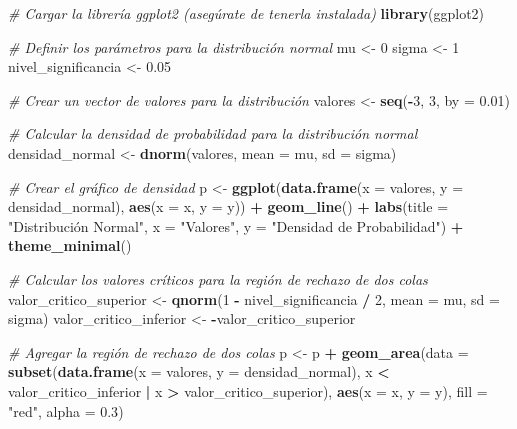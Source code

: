 \documentclass[
]{article}
\newenvironment{Shaded}{\begin{snugshade}}{\end{snugshade}}
\newcommand{\AttributeTok}[1]{\textcolor[rgb]{0.13,0.29,0.53}{#1}}
\newcommand{\CommentTok}[1]{\textcolor[rgb]{0.56,0.35,0.01}{\textit{#1}}}
\newcommand{\DecValTok}[1]{\textcolor[rgb]{0.00,0.00,0.81}{#1}}
\newcommand{\FloatTok}[1]{\textcolor[rgb]{0.00,0.00,0.81}{#1}}
\newcommand{\FunctionTok}[1]{\textcolor[rgb]{0.13,0.29,0.53}{\textbf{#1}}}
\newcommand{\NormalTok}[1]{#1}
\newcommand{\OtherTok}[1]{\textcolor[rgb]{0.56,0.35,0.01}{#1}}
\newcommand{\SpecialCharTok}[1]{\textcolor[rgb]{0.81,0.36,0.00}{\textbf{#1}}}
\newcommand{\StringTok}[1]{\textcolor[rgb]{0.31,0.60,0.02}{#1}}
\begin{document}
\begin{Shaded}
\begin{Highlighting}[]
\CommentTok{\# Cargar la librería ggplot2 (asegúrate de tenerla instalada)}
\FunctionTok{library}\NormalTok{(ggplot2)}

\CommentTok{\# Definir los parámetros para la distribución normal}
\NormalTok{mu }\OtherTok{\textless{}{-}} \DecValTok{0}
\NormalTok{sigma }\OtherTok{\textless{}{-}} \DecValTok{1}
\NormalTok{nivel\_significancia }\OtherTok{\textless{}{-}} \FloatTok{0.05}

\CommentTok{\# Crear un vector de valores para la distribución}
\NormalTok{valores }\OtherTok{\textless{}{-}} \FunctionTok{seq}\NormalTok{(}\SpecialCharTok{{-}}\DecValTok{3}\NormalTok{, }\DecValTok{3}\NormalTok{, }\AttributeTok{by =} \FloatTok{0.01}\NormalTok{)}

\CommentTok{\# Calcular la densidad de probabilidad para la distribución normal}
\NormalTok{densidad\_normal }\OtherTok{\textless{}{-}} \FunctionTok{dnorm}\NormalTok{(valores, }\AttributeTok{mean =}\NormalTok{ mu, }\AttributeTok{sd =}\NormalTok{ sigma)}

\CommentTok{\# Crear el gráfico de densidad}
\NormalTok{p }\OtherTok{\textless{}{-}} \FunctionTok{ggplot}\NormalTok{(}\FunctionTok{data.frame}\NormalTok{(}\AttributeTok{x =}\NormalTok{ valores, }\AttributeTok{y =}\NormalTok{ densidad\_normal), }\FunctionTok{aes}\NormalTok{(}\AttributeTok{x =}\NormalTok{ x, }\AttributeTok{y =}\NormalTok{ y)) }\SpecialCharTok{+}
  \FunctionTok{geom\_line}\NormalTok{() }\SpecialCharTok{+}
  \FunctionTok{labs}\NormalTok{(}\AttributeTok{title =} \StringTok{"Distribución Normal"}\NormalTok{, }\AttributeTok{x =} \StringTok{"Valores"}\NormalTok{, }\AttributeTok{y =} \StringTok{"Densidad de Probabilidad"}\NormalTok{) }\SpecialCharTok{+}
  \FunctionTok{theme\_minimal}\NormalTok{()}

\CommentTok{\# Calcular los valores críticos para la región de rechazo de dos colas}
\NormalTok{valor\_critico\_superior }\OtherTok{\textless{}{-}} \FunctionTok{qnorm}\NormalTok{(}\DecValTok{1} \SpecialCharTok{{-}}\NormalTok{ nivel\_significancia }\SpecialCharTok{/} \DecValTok{2}\NormalTok{, }\AttributeTok{mean =}\NormalTok{ mu, }\AttributeTok{sd =}\NormalTok{ sigma)}
\NormalTok{valor\_critico\_inferior }\OtherTok{\textless{}{-}} \SpecialCharTok{{-}}\NormalTok{valor\_critico\_superior}

\CommentTok{\# Agregar la región de rechazo de dos colas}
\NormalTok{p }\OtherTok{\textless{}{-}}\NormalTok{ p }\SpecialCharTok{+} \FunctionTok{geom\_area}\NormalTok{(}\AttributeTok{data =} \FunctionTok{subset}\NormalTok{(}\FunctionTok{data.frame}\NormalTok{(}\AttributeTok{x =}\NormalTok{ valores, }\AttributeTok{y =}\NormalTok{ densidad\_normal), x }\SpecialCharTok{\textless{}}\NormalTok{ valor\_critico\_inferior }\SpecialCharTok{|}\NormalTok{ x }\SpecialCharTok{\textgreater{}}\NormalTok{ valor\_critico\_superior),}
                   \FunctionTok{aes}\NormalTok{(}\AttributeTok{x =}\NormalTok{ x, }\AttributeTok{y =}\NormalTok{ y), }\AttributeTok{fill =} \StringTok{"red"}\NormalTok{, }\AttributeTok{alpha =} \FloatTok{0.3}\NormalTok{)}


\end{Highlighting}
\end{Shaded}
\end{document}
